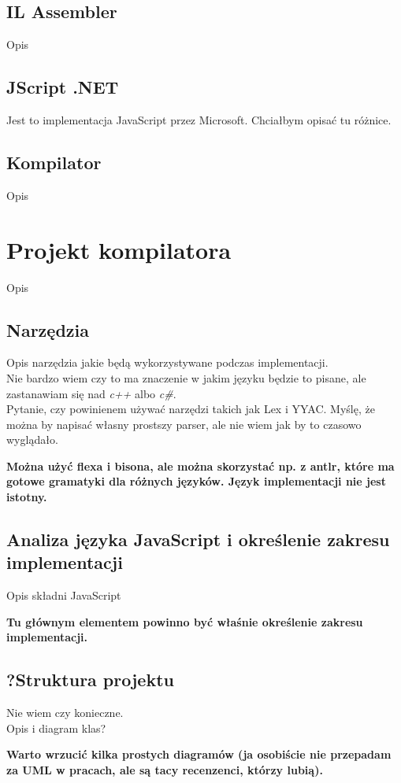 \documentclass[a4paper]{article}
\begin{document}
\subsection{IL Assembler}
Opis
\subsection{JScript .NET}
Jest to implementacja JavaScript przez Microsoft. Chciałbym opisać tu różnice.
\subsection{Kompilator}
Opis

\section{Projekt kompilatora}
Opis 
\subsection{Narzędzia}
Opis narzędzia jakie będą wykorzystywane podczas implementacji. 
\\
Nie bardzo wiem czy to ma znaczenie w jakim języku będzie to pisane, ale zastanawiam się nad \textit{c++} albo \textit{c\#}.
\\
Pytanie, czy powinienem używać narzędzi takich jak Lex i YYAC. Myślę, że można by napisać własny prostszy parser, ale nie wiem jak by to czasowo wyglądało.

\textbf{Można użyć flexa i bisona, ale można skorzystać np. z antlr, które ma gotowe gramatyki dla różnych języków. Język implementacji nie jest istotny.}

\subsection{Analiza języka JavaScript i określenie zakresu implementacji}
Opis składni JavaScript

\textbf{Tu głównym elementem powinno być właśnie określenie zakresu implementacji.}

\subsection{?Struktura projektu}
Nie wiem czy konieczne.
\\
Opis i diagram klas?

\textbf{Warto wrzucić kilka prostych diagramów (ja osobiście nie przepadam za UML w pracach, ale są tacy recenzenci, którzy lubią).}
\end{document}
